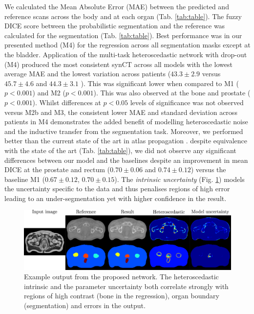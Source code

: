We calculated the Mean Absolute Error (MAE) between the predicted and reference scans across the body and at each organ (Tab. \ref{tab:table}). The fuzzy DICE score between the probabilistic segmentation and the reference was calculated for the segmentation (Tab. \ref{tab:table}). Best performance was in our presented method (M4) for the regression across all segmentation masks except at the bladder. Application of the multi-task heteroscedastic network with drop-out (M4) produced the most consistent synCT across all models with the lowest average MAE and the lowest variation across patients ($43.3\pm2.9$ versus $45.7\pm4.6$ \cite{ninon2017} and $44.3\pm3.1$ \cite{kendall2017multi}). This was significant lower when compared to M1 ($p<0.001$) and M2 ($p<0.001$). This was also observed at the bone and prostate ($p<0.001$). Whilst differences at $p<0.05$ levels of significance was not observed versus M2b and M3, the consistent lower MAE and standard deviation across patients in M4 demonstrates the added benefit of modelling heteroscedastic noise and the inductive transfer from the segmentation task. Moreover, we performed better than the current state of the art in atlas propagation \cite{ninon2017}. despite equivalence with the state of the art (Tab. \ref{tab:table}), we did not observe any significant differences between our model and the baselines despite an improvement in mean DICE at the prostate and rectum ($0.70\pm0.06$ and $0.74\pm0.12$) versus the baseline M1 ($0.67\pm0.12$, $0.70\pm0.15$). The \emph{intrinsic uncertainty} (Fig. \ref{fig:diagram2}) models the uncertainty specific to the data and thus penalises regions of high error leading to an under-segmentation yet with higher confidence in the result.

\begin{figure}[!t]
		\centering
\includegraphics[height=0.275\textwidth]{chapter_5/figures/figure_1_res.pdf}
		\caption{Example output from the proposed network. The heteroscedastic intrinsic and the parameter uncertainty both correlate strongly with regions of high contrast (bone in the regression), organ boundary (segmentation) and errors in the output.} 

		\label{fig:diagram2}
        \vspace{-2mm}
\end{figure}

